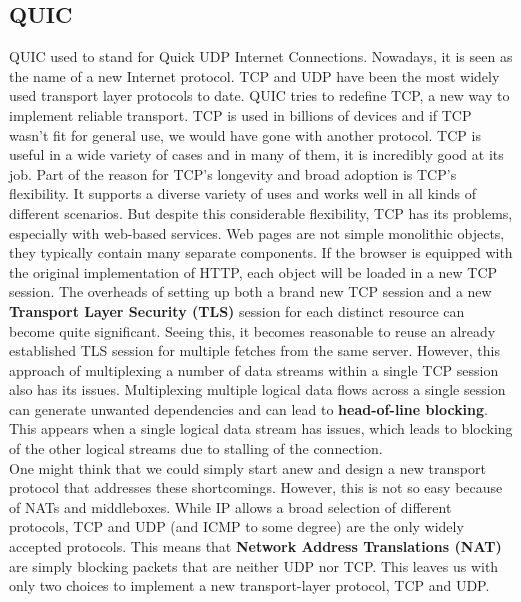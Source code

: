\subsection{QUIC}
QUIC used to stand for Quick UDP Internet Connections. Nowadays, it is seen as the name of a new Internet protocol. TCP and UDP have been the most widely used transport layer protocols to date. QUIC tries to redefine TCP, a new way to implement reliable transport. TCP is used in billions of devices and if TCP wasn't fit for general use, we would have gone with another protocol. TCP is useful in a wide variety of cases and in many of them, it is incredibly good at its job. Part of the reason for TCP's longevity and broad adoption is TCP's flexibility. It supports a diverse variety of uses and works well in all kinds of different scenarios. But despite this considerable flexibility, TCP has its problems, especially with web-based services. Web pages are not simple monolithic objects, they typically contain many separate components. If the browser is equipped with the original implementation of HTTP, each object will be loaded in a new TCP session. The overheads of setting up both a brand new TCP session and a new \textbf{Transport Layer Security (TLS)} session for each distinct resource can become quite significant. Seeing this, it becomes reasonable to reuse an already established TLS session for multiple fetches from the same server. However, this approach of multiplexing a number of data streams within a single TCP session also has its issues. Multiplexing multiple logical data flows across a single session can generate unwanted dependencies and can lead to \textbf{head-of-line blocking}. This appears when a single logical data stream has issues, which leads to blocking of the other logical streams due to stalling of the connection. \vspace{.3cm}\\

One might think that we could simply start anew and design a new transport protocol that addresses these shortcomings. However, this is not so easy because of NATs and middleboxes. While IP allows a broad selection of different protocols, TCP and UDP (and ICMP to some degree) are the only widely accepted protocols. This means that \textbf{Network Address Translations (NAT)} are simply blocking packets that are neither UDP nor TCP. This leaves us with only two choices to implement a new transport-layer protocol, TCP and UDP.\vspace{.3cm}\\

